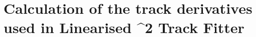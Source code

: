 \chapter{Calculation of the track derivatives used in Linearised \chi^{2} Track Fitter}\label{app:chi2}